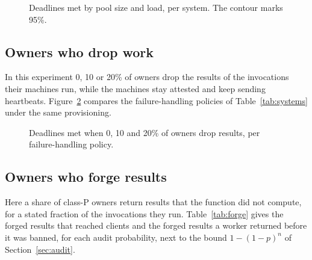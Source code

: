 \begin{figure}[t]
\centering
{}
\caption{Deadlines met by pool size and load, per system. The contour marks 95\%.}
\label{fig:region}
\end{figure}

\subsection{Owners who drop work}
\label{sec:res-drop}

In this experiment 0, 10 or 20\% of owners drop the results of the invocations their machines run, while the machines
stay attested and keep sending heartbeats. Figure~\ref{fig:drop} compares the failure-handling policies of
Table~\ref{tab:systems} under the same provisioning. 

\begin{figure}[t]
\centering
{}
\caption{Deadlines met when 0, 10 and 20\% of owners drop results, per failure-handling policy.}
\label{fig:drop}
\end{figure}

\subsection{Owners who forge results}
\label{sec:res-forge}

Here a share of class-P owners return results that the function did not compute, for a stated fraction of the
invocations they run. Table~\ref{tab:forge} gives the forged results that reached clients and the forged results a
worker returned before it was banned, for each audit probability, next to the bound $1-(1-p)^n$ of
Section~\ref{sec:audit}. 

\begin{table}[t]
\caption{Forged results accepted and results until the ban, by audit probability $p$ and share of class-P owners.}
\label{tab:forge}
\small
{}
\end{table}

